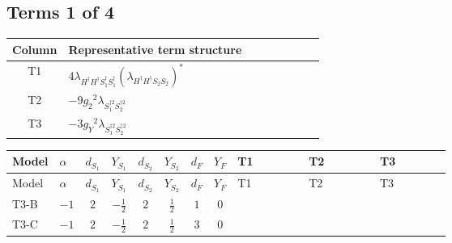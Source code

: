 \documentclass[8pt]{article}
\begin{document}
\begin{landscape}
\subsection*{Terms 1 of 4}
\begin{center}
\begin{tabular}{@{}c >{\raggedright\arraybackslash}p{0.82\linewidth}@{}}
\toprule
Column & Representative term structure \\
\midrule
T1 & \(\displaystyle 4 {\lambda_{H^\dagger H^\dagger S_1^\dagger S_1^\dagger}} \left({\lambda_{H^\dagger H^\dagger S_2 S_2}}\right)^{*}\) \\
\midrule
T2 & \(\displaystyle -9 {g_2}^2 {\lambda_{S_1^{\dagger 2}S_2^{\dagger 2}}}\) \\
\midrule
T3 & \(\displaystyle -3 {g_Y}^2 {\lambda_{S_1^{\dagger 2}S_2^{\dagger 2}}}\) \\
\midrule
\bottomrule
\end{tabular}
\end{center}
\smallskip
\tiny
\begin{longtable}{@{}llcccccc >{\raggedright\arraybackslash}p{0.21\linewidth} >{\raggedright\arraybackslash}p{0.21\linewidth} >{\raggedright\arraybackslash}p{0.21\linewidth}@{}}
\toprule
Model & $\alpha$ & $d_{S_1}$ & $Y_{S_1}$ & $d_{S_2}$ & $Y_{S_2}$ & $d_F$ & $Y_F$ & T1 & T2 & T3 \\
\midrule
\endfirsthead
\toprule
Model & $\alpha$ & $d_{S_1}$ & $Y_{S_1}$ & $d_{S_2}$ & $Y_{S_2}$ & $d_F$ & $Y_F$ & T1 & T2 & T3 \\
\midrule
\endhead
T3-B & $-1$ & $2$ & $-\frac{1}{2}$ & $2$ & $\frac{1}{2}$ & $1$ & $0$ & \scriptsize\adjustbox{max width=\linewidth}{$\begin{gathered} 4 {\lambda_{H^\dagger H^\dagger S_1^\dagger S_1^\dagger}} \left({\lambda_{H^\dagger H^\dagger S_2 S_2}}\right)^{*}\end{gathered}$} & \scriptsize\adjustbox{max width=\linewidth}{$\begin{gathered} -9 {g_2}^2 {\lambda_{S_1^{\dagger 2}S_2^{\dagger 2}}}\end{gathered}$} & \scriptsize\adjustbox{max width=\linewidth}{$\begin{gathered} -3 {g_Y}^2 {\lambda_{S_1^{\dagger 2}S_2^{\dagger 2}}}\end{gathered}$} \\
\midrule
T3-C & $-1$ & $2$ & $-\frac{1}{2}$ & $2$ & $\frac{1}{2}$ & $3$ & $0$ & \scriptsize\adjustbox{max width=\linewidth}{$\begin{gathered} 4 {\lambda_{H^\dagger H^\dagger S_1^\dagger S_1^\dagger}} \left({\lambda_{H^\dagger H^\dagger S_2 S_2}}\right)^{*}\end{gathered}$} & \scriptsize\adjustbox{max width=\linewidth}{$\begin{gathered} -9 {g_2}^2 {\lambda_{S_1^{\dagger 2}S_2^{\dagger 2}}}\end{gathered}$} & \scriptsize\adjustbox{max width=\linewidth}{$\begin{gathered} -3 {g_Y}^2 {\lambda_{S_1^{\dagger 2}S_2^{\dagger 2}}}\end{gathered}$} \\

\end{longtable}
\end{landscape}
\end{document}
